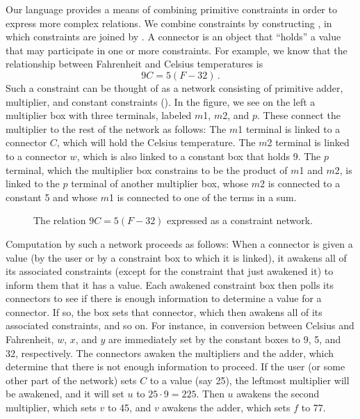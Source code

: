 Our language provides a means of combining primitive constraints in order to express more complex relations.
We combine constraints by constructing , in which constraints are joined by .
A connector is an object that “holds” a value that may participate in one or more constraints.
For example, we know that the relationship between Fahrenheit and Celsius temperatures is
\[
	9 C = 5 (F - 32) \,.
\]
Such a constraint can be thought of as a network consisting of primitive adder, multiplier, and constant constraints ().
In the figure, we see on the left a multiplier box with three terminals, labeled \( m \)1, \( m \)2, and \( p \).
These connect the multiplier to the rest of the network as follows:
The \( m \)1 terminal is linked to a connector \( C \), which will hold the Celsius temperature.
The \( m \)2 terminal is linked to a connector \( w \), which is also linked to a constant box that holds 9.
The \( p \) terminal, which the multiplier box constrains to be the product of \( m \)1 and \( m \)2, is linked to the \( p \) terminal of another multiplier box, whose \( m \)2 is connected to a constant 5 and whose \( m \)1 is connected to one of the terms in a sum.

\begin{figure}[tb]
	\centering
	
	\caption{
		The relation \( 9 C = 5 (F - 32) \) expressed as a constraint network.
	}
	\label{Figure 3.28}
\end{figure}

Computation by such a network proceeds as follows:
When a connector is given a value (by the user or by a constraint box to which it is linked), it awakens all of its associated constraints (except for the constraint that just awakened it) to inform them that it has a value.
Each awakened constraint box then polls its connectors to see if there is enough information to determine a value for a connector.
If so, the box sets that connector, which then awakens all of its associated constraints, and so on.
For instance, in conversion between Celsius and Fahrenheit, \( w \), \( x \), and \( y \) are immediately set by the constant boxes to 9, 5, and 32, respectively.
The connectors awaken the multipliers and the adder, which determine that there is not enough information to proceed.
If the user (or some other part of the network) sets \( C \) to a value (say 25), the leftmost multiplier will be awakened, and it will set \( u \) to \( 25 ⋅ 9 = 225 \).
Then \( u \) awakens the second multiplier, which sets \( v \) to 45, and \( v \) awakens the adder, which sets \( f \) to 77.



